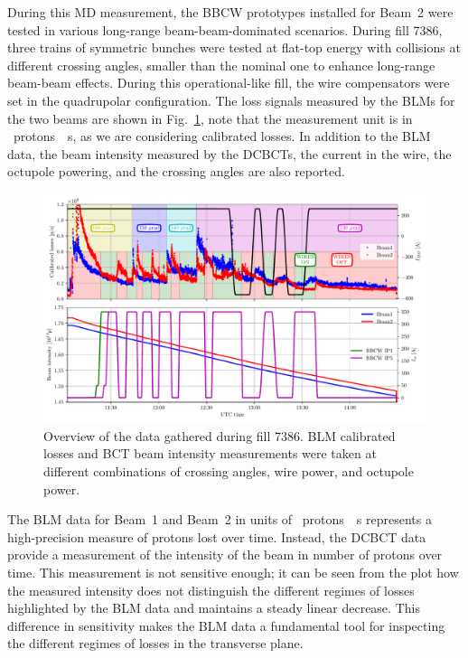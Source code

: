 During this MD measurement, the BBCW prototypes installed for Beam~2 were tested in various long-range beam-beam-dominated scenarios. During fill 7386, three trains of symmetric bunches were tested at flat-top energy with collisions at different crossing angles, smaller than the nominal one to enhance long-range beam-beam effects. During this operational-like fill, the wire compensators were set in the quadrupolar configuration. The loss signals measured by the BLMs for the two beams are shown in Fig.~\ref{fig:wire-data}, note that the measurement unit is in \SI{}{protons \per s}, as we are considering calibrated losses. In addition to the BLM data, the beam intensity measured by the DCBCTs, the current in the wire, the octupole powering, and the crossing angles are also reported. 

\begin{figure}[hpt]
    \centering
    \includegraphics[width=1.0\textwidth]{5_wire_compensators_LHC/figs/wire_summary.pdf}
    \caption{Overview of the data gathered during fill 7386. BLM calibrated losses and BCT beam intensity measurements were taken at different combinations of crossing angles, wire power, and octupole power.}
    \label{fig:wire-data}
\end{figure}

The BLM data for Beam~1 and Beam~2 in units of \SI{}{protons \per s} represents a high-precision measure of protons lost over time. Instead, the DCBCT data provide a measurement of the intensity of the beam in number of protons over time. This measurement is not sensitive enough; it can be seen from the plot how the measured intensity does not distinguish the different regimes of losses highlighted by the BLM data and maintains a steady linear decrease. This difference in sensitivity makes the BLM data a fundamental tool for inspecting the different regimes of losses in the transverse plane.  

